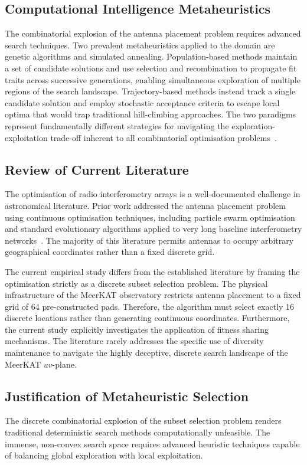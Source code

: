 \documentclass[conference]{IEEEtran}
\begin{document}
\subsection{Computational Intelligence Metaheuristics}
The combinatorial explosion of the antenna placement problem requires advanced search 
techniques. Two prevalent metaheuristics applied to the domain are genetic algorithms 
and simulated annealing. Population-based methods maintain a set of candidate solutions 
and use selection and recombination to propagate fit traits across successive generations, 
enabling simultaneous exploration of multiple regions of the search landscape. 
Trajectory-based methods instead track a single candidate solution and employ stochastic 
acceptance criteria to escape local optima that would trap traditional hill-climbing 
approaches. The two paradigms represent fundamentally different strategies for navigating 
the exploration-exploitation trade-off inherent to all combinatorial optimisation problems~\cite{engelbrecht2007}.

\subsection{Review of Current Literature}
The optimisation of radio interferometry arrays is a well-documented challenge in 
astronomical literature. Prior work addressed the antenna placement problem using continuous optimisation 
techniques, including particle swarm optimisation and standard evolutionary algorithms 
applied to very long baseline interferometry networks~\cite{thompson2017}. The majority 
of this literature permits antennas to occupy arbitrary geographical coordinates rather 
than a fixed discrete grid.

The current empirical study differs from the established literature by framing the 
optimisation strictly as a discrete subset selection problem. The physical 
infrastructure of the MeerKAT observatory restricts antenna placement to a fixed 
grid of 64 pre-constructed pads. Therefore, the algorithm must select exactly 16 
discrete locations rather than generating continuous coordinates. Furthermore, the 
current study explicitly investigates the application of fitness sharing mechanisms. 
The literature rarely addresses the specific use of diversity maintenance to navigate 
the highly deceptive, discrete search landscape of the MeerKAT $uv$-plane.

\subsection{Justification of Metaheuristic Selection}
The discrete combinatorial explosion of the subset selection problem renders traditional deterministic 
search methods computationally unfeasible. The immense, non-convex search space requires advanced heuristic 
techniques capable of balancing global exploration with local exploitation.
\end{document}

